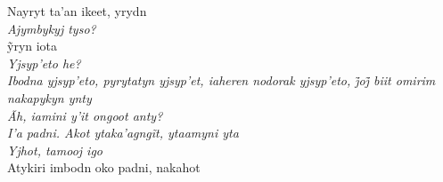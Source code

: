 \begin{linenumbers}\begingroup\raggedright

\noindent   Nayryt ta'an ikeet, yrydn\\
  \emph{Ajymbykyj tyso?}\\
  ỹryn iota\\
  \emph{Yjsyp'eto he?}\\
  \emph{Ibodna yjsyp’eto, pyrytatyn yjsyp’et, iaheren nodorak yjsyp’eto, j̃oj̃ biit omirim nakapykyn ynty}\\
  \emph{Ãh, iamini y'it ongoot anty?}\\
  \emph{I’a padni. Akot ytaka’agngĩt, ytaamyni yta}\\
  \emph{Yjhot, tamooj igo}\\
  Atykiri imbodn oko padni, nakahot

\end{linenumbers}\endgroup

\bigskip

